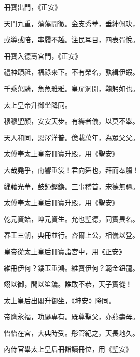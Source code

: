 \begin{pinyinscope}
 冊寶出門，《正安》



 天門九重，蕩蕩開徹。金支秀華，垂紳佩玦，



 或導或陪，率履不越。注民耳目，四表胥悅。



 冊寶入德壽宮門，《正安》



 禮神頌祗，福祿來下。不有榮名，孰緝伊嘏。



 千乘萬騎，魚魚雅雅。皇扉洞開，鞠躬如也。



 太上皇帝升御坐降同。



 穆穆聖顏，安安天步。有縟者儀，以莫不舉。



 天人和同，恩澤洋普。億載萬年，為眾父父。



 太傅奉太上皇帝冊寶升殿，用《聖安》



 大哉堯乎，南響垂裳！君向舜也，拜而奉觴！



 繅藉光華，鼓鐘鏗鏘。三事稽首，宋德無疆。



 太傅奉太上皇后冊寶升殿，用《聖安》



 乾元資始，坤元資生。允也聖德，同實異名。



 春王三朝，典冊並行。咨爾上公，相儀以登。



 皇帝從太上皇后冊寶詣宮中，用《正安》



 維冊伊何？鏤玉垂鴻。維寶伊何？範金鈕龍。



 翊以御，間以笙鏞。誰敢不恭，天子實從！



 太上皇后出閣升御坐，《坤安》降同。



 帝膺永福，功靡專有。既尊聖父，亦燕壽母。



 怡怡在宮，大典時受。彤管紀之，天長地久。



 內侍官舉太上皇后冊詣讀冊位，用《聖安》




\end{pinyinscope}
